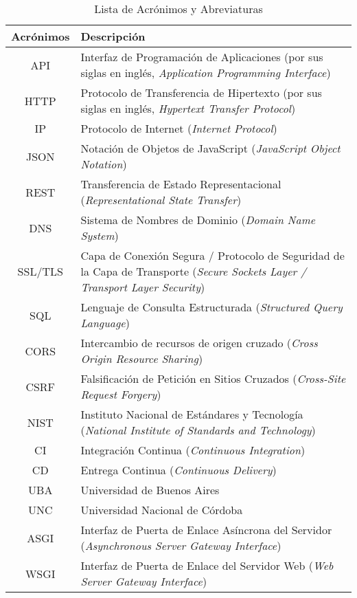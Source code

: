 \begin{table}[H]
    \centering
    \begin{tabular}{|c|p{10cm}|}
    \hline
         \textbf{Acrónimos} & \textbf{Descripción}\\
    \hline
         API & Interfaz de Programación de Aplicaciones (por sus siglas en inglés, \textit{Application Programming Interface})\\
    \hline
         HTTP & Protocolo de Transferencia de Hipertexto (por sus siglas en inglés, \textit{Hypertext Transfer Protocol})\\
    \hline
         IP & Protocolo de Internet (\textit{Internet Protocol})\\
    \hline
         JSON & Notación de Objetos de JavaScript (\textit{JavaScript Object Notation}) \\
    \hline
         REST & Transferencia de Estado Representacional (\textit{Representational State Transfer}) \\
    \hline
        DNS & Sistema de Nombres de Dominio (\textit{Domain Name System}) \\
    \hline
        SSL/TLS & Capa de Conexión Segura / Protocolo de Seguridad de la Capa de Transporte (\textit{Secure Sockets Layer / Transport Layer Security}) \\
    \hline
        SQL & Lenguaje de Consulta Estructurada (\textit{Structured Query Language}) \\
    \hline
        CORS & Intercambio de recursos de origen cruzado (\textit{Cross Origin Resource Sharing})\\
    \hline
         CSRF & Falsificación de Petición en Sitios Cruzados (\textit{Cross-Site Request Forgery}) \\
    \hline
         NIST & Instituto Nacional de Estándares y Tecnología (\textit{National Institute of Standards and Technology}) \\
    \hline
        CI & Integración Continua (\textit{Continuous Integration}) \\
    \hline
        CD & Entrega Continua (\textit{Continuous Delivery}) \\
    \hline
        UBA & Universidad de Buenos Aires \\
    \hline
        UNC & Universidad Nacional de Córdoba \\
    \hline
       ASGI & Interfaz de Puerta de Enlace Asíncrona del Servidor (\textit{Asynchronous Server Gateway Interface}) \\
    \hline
        WSGI & Interfaz de Puerta de Enlace del Servidor Web (\textit{Web Server Gateway Interface}) \\
    \hline
        
    \end{tabular}
    \caption{Lista de Acrónimos y Abreviaturas}
    \label{tab:my_label}
\end{table}
